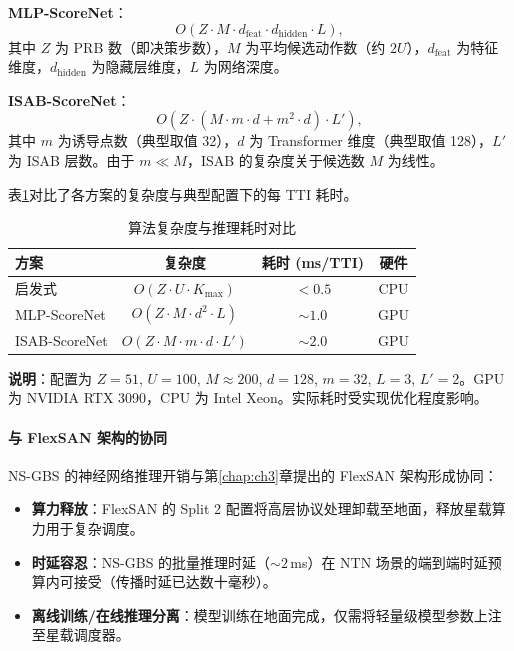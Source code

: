 \documentclass[type=master]{fduthesis}
\begin{document}
\textbf{MLP-ScoreNet}：
\begin{equation}
O(Z \cdot M \cdot d_{\text{feat}} \cdot d_{\text{hidden}} \cdot L),
\label{eq:ch4_mlp_complexity}
\end{equation}
其中 $Z$ 为 PRB 数（即决策步数），$M$ 为平均候选动作数（约 $2U$），$d_{\text{feat}}$ 为特征维度，$d_{\text{hidden}}$ 为隐藏层维度，$L$ 为网络深度。

\textbf{ISAB-ScoreNet}：
\begin{equation}
O(Z \cdot (M \cdot m \cdot d + m^2 \cdot d) \cdot L'),
\label{eq:ch4_isab_complexity}
\end{equation}
其中 $m$ 为诱导点数（典型取值 32），$d$ 为 Transformer 维度（典型取值 128），$L'$ 为 ISAB 层数。由于 $m \ll M$，ISAB 的复杂度关于候选数 $M$ 为线性。

表\ref{tab:ch4_complexity}对比了各方案的复杂度与典型配置下的每 TTI 耗时。

\begin{table}[t]
\centering
\caption{算法复杂度与推理耗时对比}
\label{tab:ch4_complexity}
\begin{tabular}{lccc}
\toprule
\textbf{方案} & \textbf{复杂度} & \textbf{耗时 (ms/TTI)} & \textbf{硬件} \\
\midrule
启发式 & $O(Z \cdot U \cdot K_{\max})$ & $< 0.5$ & CPU \\
MLP-ScoreNet & $O(Z \cdot M \cdot d^2 \cdot L)$ & $\sim 1.0$ & GPU \\
ISAB-ScoreNet & $O(Z \cdot M \cdot m \cdot d \cdot L')$ & $\sim 2.0$ & GPU \\
\bottomrule
\end{tabular}
\begin{minipage}{0.95\linewidth}
\footnotesize
\vspace{0.5em}
\noindent\textbf{说明}：配置为 $Z=51$, $U=100$, $M \approx 200$, $d=128$, $m=32$, $L=3$, $L'=2$。GPU 为 NVIDIA RTX 3090，CPU 为 Intel Xeon。实际耗时受实现优化程度影响。
\end{minipage}
\end{table}

\paragraph{与 FlexSAN 架构的协同}
NS-GBS 的神经网络推理开销与第\ref{chap:ch3}章提出的 FlexSAN 架构形成协同：

\begin{itemize}
\item \textbf{算力释放}：FlexSAN 的 Split 2 配置将高层协议处理卸载至地面，释放星载算力用于复杂调度。
\item \textbf{时延容忍}：NS-GBS 的批量推理时延（$\sim 2$\,ms）在 NTN 场景的端到端时延预算内可接受（传播时延已达数十毫秒）。
\item \textbf{离线训练/在线推理分离}：模型训练在地面完成，仅需将轻量级模型参数上注至星载调度器。
\end{itemize}
\end{document}

